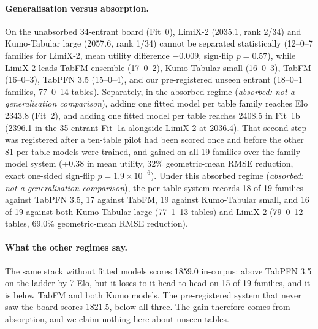 \begin{table}[t]
\caption{The dev91 reference board under three regimes, in separate ladder fits. Elo values compare only
within a fit; no row of one block is ranked against another block. Absorbed systems (\emph{absorbed: not a
generalisation comparison}) were fitted on the scored tables' rows, test labels included, on random splits; external
models saw no test row (for LimiX-2, inference ran on a shared card at a 0.20 memory cap, diagnostic only:
\emph{release checkpoint ed01f7a0 (HF de07b679); upstream found it contaminated with benchmark data
(autogluon/tabarena\#648; makers' audit 2026-11-11); TabArena dropped it 2026-11-16 for LimiX-2-1016}). 95\% intervals are about 300 to 500 Elo wide (1823 to 2362 for
LimiX-2 in Fit~0; 2219 to 2754 for the per-table row in Fit~1a; 2237 to 2726 in Fit~1b). A later series of seven
adaptive unseen reads reached 1842.0 in another fit.}
\label{tab:blackhole-dev91}
\end{table}

\paragraph{Generalisation versus absorption.} On the unabsorbed 34-entrant board (Fit~0), LimiX-2 (2035.1, rank 2/34)
and Kumo-Tabular large (2057.6, rank 1/34) cannot be separated statistically (12--0--7 families for LimiX-2, mean
utility difference $-0.009$, sign-flip $p = 0.57$), while LimiX-2 leads TabFM ensemble (17--0--2), Kumo-Tabular small
(16--0--3), TabFM (16--0--3), TabPFN 3.5 (15--0--4), and our pre-registered unseen entrant (18--0--1 families,
77--0--14 tables). Separately, in the absorbed regime (\emph{absorbed: not a generalisation comparison}), adding one
fitted model per table family reaches Elo 2343.8 (Fit~2), and adding one fitted model per table reaches 2408.5 in
Fit~1b (2396.1 in the 35-entrant Fit~1a alongside LimiX-2 at 2036.4). That second step was registered after a
ten-table pilot had been scored once and before the other 81 per-table models were trained, and gained on all 19
families over the family-model system (+0.38 in mean utility, 32\% geometric-mean RMSE reduction, exact one-sided sign-flip
$p = 1.9\times10^{-6}$). Under this absorbed regime (\emph{absorbed: not a generalisation comparison}), the per-table
system records 18 of 19 families against TabPFN 3.5, 17 against TabFM, 19 against Kumo-Tabular small, and 16 of 19
against both Kumo-Tabular large (77--1--13 tables) and LimiX-2 (79--0--12 tables, 69.0\% geometric-mean RMSE reduction).

\paragraph{What the other regimes say.} The same stack without fitted models scores 1859.0 in-corpus: above
TabPFN 3.5 on the ladder by 7 Elo, but it loses to it head to head on 15 of 19 families, and it is below TabFM and
both Kumo models. The pre-registered system that never saw the board scores 1821.5, below all three. The gain therefore comes
from absorption, and we claim nothing here about unseen tables.

